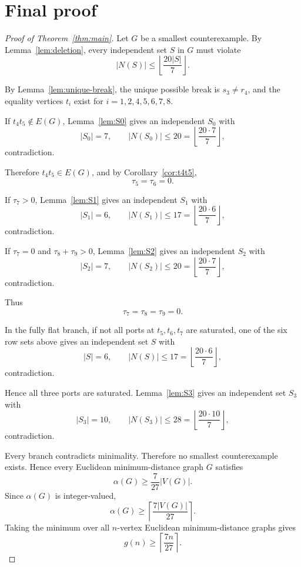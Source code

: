 \documentclass[11pt]{article}
\newcommand{\floor}[1]{\left\lfloor #1 \right\rfloor}
\newcommand{\ceil}[1]{\left\lceil #1 \right\rceil}
\begin{document}
\section{Final proof}

\begin{proof}[Proof of Theorem~\ref{thm:main}]
Let $G$ be a smallest counterexample. By Lemma~\ref{lem:deletion}, every independent set $S$ in $G$ must violate
\[
  |N(S)|\le \floor{\frac{20|S|}{7}}.
\]

By Lemma~\ref{lem:unique-break}, the unique possible break is $s_3\ne r_4$, and the equality vertices $t_i$ exist for $i=1,2,4,5,6,7,8$.

If $t_4t_5\notin E(G)$, Lemma~\ref{lem:S0} gives an independent $S_0$ with
\[
  |S_0|=7,
  \qquad |N(S_0)|\le20=\floor{\frac{20\cdot7}{7}},
\]
contradiction.

Therefore $t_4t_5\in E(G)$, and by Corollary~\ref{cor:t4t5},
\[
  \tau_5=\tau_6=0.
\]

If $\tau_7>0$, Lemma~\ref{lem:S1} gives an independent $S_1$ with
\[
  |S_1|=6,
  \qquad |N(S_1)|\le17=\floor{\frac{20\cdot6}{7}},
\]
contradiction.

If $\tau_7=0$ and $\tau_8+\tau_9>0$, Lemma~\ref{lem:S2} gives an independent $S_2$ with
\[
  |S_2|=7,
  \qquad |N(S_2)|\le20=\floor{\frac{20\cdot7}{7}},
\]
contradiction.

Thus
\[
  \tau_7=\tau_8=\tau_9=0.
\]

In the fully flat branch, if not all ports at $t_5,t_6,t_7$ are saturated, one of the six row sets above gives an independent set $S$ with
\[
  |S|=6,
  \qquad |N(S)|\le17=\floor{\frac{20\cdot6}{7}},
\]
contradiction.

Hence all three ports are saturated. Lemma~\ref{lem:S3} gives an independent set $S_3$ with
\[
  |S_3|=10,
  \qquad |N(S_3)|\le28=\floor{\frac{20\cdot10}{7}},
\]
contradiction.

Every branch contradicts minimality. Therefore no smallest counterexample exists. Hence every Euclidean minimum-distance graph $G$ satisfies
\[
  \alpha(G)\ge \frac{7}{27}|V(G)|.
\]
Since $\alpha(G)$ is integer-valued,
\[
  \alpha(G)\ge \ceil{\frac{7|V(G)|}{27}}.
\]
Taking the minimum over all $n$-vertex Euclidean minimum-distance graphs gives
\[
  g(n)\ge \ceil{\frac{7n}{27}}.
\]
\end{proof}
\end{document}
